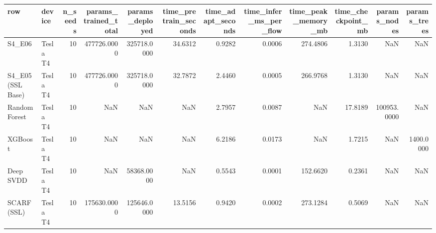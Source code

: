 \begin{tabular}{llrrrrrrrrrr}
\toprule
row & device & n_seeds & params_trained_total & params_deployed & time_pretrain_seconds & time_adapt_seconds & time_infer_ms_per_flow & time_peak_memory_mb & time_checkpoint_mb & params_nodes & params_trees \\
\midrule
S4_E06 & Tesla T4 & 10 & 477726.0000 & 325718.0000 & 34.6312 & 0.9282 & 0.0006 & 274.4806 & 1.3130 & NaN & NaN \\
S4_E05 (SSL Base) & Tesla T4 & 10 & 477726.0000 & 325718.0000 & 32.7872 & 2.4460 & 0.0005 & 266.9768 & 1.3130 & NaN & NaN \\
Random Forest & Tesla T4 & 10 & NaN & NaN & NaN & 2.7957 & 0.0087 & NaN & 17.8189 & 100953.0000 & NaN \\
XGBoost & Tesla T4 & 10 & NaN & NaN & NaN & 6.2186 & 0.0173 & NaN & 1.7215 & NaN & 1400.0000 \\
Deep SVDD & Tesla T4 & 10 & NaN & 58368.0000 & NaN & 0.5543 & 0.0001 & 152.6620 & 0.2361 & NaN & NaN \\
SCARF (SSL) & Tesla T4 & 10 & 175630.0000 & 125646.0000 & 13.5156 & 0.9420 & 0.0002 & 273.1284 & 0.5069 & NaN & NaN \\
\bottomrule
\end{tabular}
